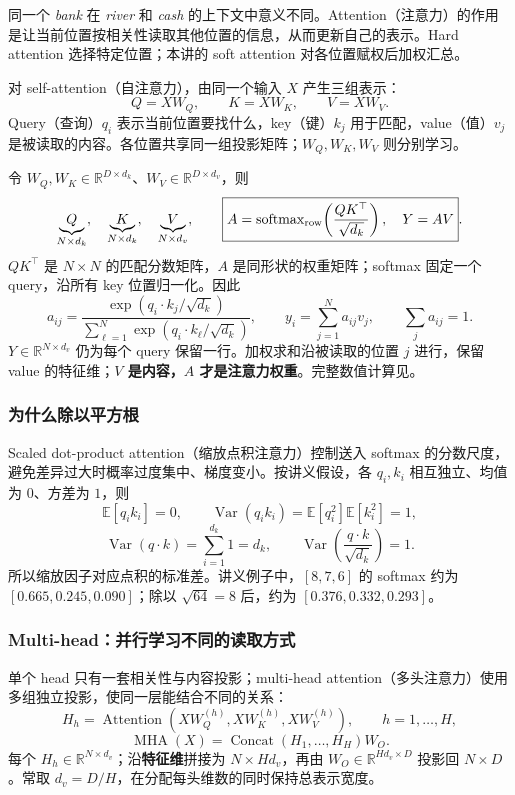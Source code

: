 同一个 \emph{bank} 在 \emph{river} 和 \emph{cash} 的上下文中意义不同。Attention（注意力）的作用是让当前位置按相关性读取其他位置的信息，从而更新自己的表示。Hard attention 选择特定位置；本讲的 soft attention 对各位置赋权后加权汇总。

对 self-attention（自注意力），由同一个输入 $X$ 产生三组表示：
\[
 Q=XW_Q,\qquad K=XW_K,\qquad V=XW_V.
\]
Query（查询）$q_i$ 表示当前位置要找什么，key（键）$k_j$ 用于匹配，value（值）$v_j$ 是被读取的内容。各位置共享同一组投影矩阵；$W_Q,W_K,W_V$ 则分别学习。

令 $W_Q,W_K\in\mathbb R^{D\times d_k}$、$W_V\in\mathbb R^{D\times d_v}$，则
\[
 \underbrace{Q}_{N\times d_k},\quad
 \underbrace{K}_{N\times d_k},\quad
 \underbrace{V}_{N\times d_v},\qquad
 \boxed{A=\operatorname{softmax}_{\rm row}\!\left(\frac{QK^\top}{\sqrt{d_k}}\right),
 \quad Y=AV}.
\]
$QK^\top$ 是 $N\times N$ 的匹配分数矩阵，$A$ 是同形状的权重矩阵；softmax 固定一个 query，沿所有 key 位置归一化。因此
\[
 a_{ij}=\frac{\exp(q_i\cdot k_j/\sqrt{d_k})}
 {\sum_{\ell=1}^{N}\exp(q_i\cdot k_\ell/\sqrt{d_k})},
 \qquad y_i=\sum_{j=1}^{N}a_{ij}v_j,\qquad \sum_j a_{ij}=1.
\]
$Y\in\mathbb R^{N\times d_v}$ 仍为每个 query 保留一行。加权求和沿被读取的位置 $j$ 进行，保留 value 的特征维；\textbf{$V$ 是内容，$A$ 才是注意力权重}。完整数值计算见。

\subsubsection{为什么除以平方根}

Scaled dot-product attention（缩放点积注意力）控制送入 softmax 的分数尺度，避免差异过大时概率过度集中、梯度变小。按讲义假设，各 $q_i,k_i$ 相互独立、均值为 $0$、方差为 $1$，则
\[
 \mathbb E[q_i k_i]=0,\qquad
 \operatorname{Var}(q_i k_i)=\mathbb E[q_i^2]\mathbb E[k_i^2]=1,
\]
\[
 \operatorname{Var}(q\cdot k)=\sum_{i=1}^{d_k}1=d_k,
 \qquad \operatorname{Var}\!\left(\frac{q\cdot k}{\sqrt{d_k}}\right)=1.
\]
所以缩放因子对应点积的标准差。讲义例子中，$[8,7,6]$ 的 softmax 约为 $[0.665,0.245,0.090]$；除以 $\sqrt{64}=8$ 后，约为 $[0.376,0.332,0.293]$。

\subsubsection{Multi-head：并行学习不同的读取方式}

单个 head 只有一套相关性与内容投影；multi-head attention（多头注意力）使用多组独立投影，使同一层能结合不同的关系：
\[
 H_h=\operatorname{Attention}(XW_Q^{(h)},XW_K^{(h)},XW_V^{(h)}),
 \qquad h=1,\ldots,H,
\]
\[
 \operatorname{MHA}(X)=\operatorname{Concat}(H_1,\ldots,H_H)W_O.
\]
每个 $H_h\in\mathbb R^{N\times d_v}$；沿\textbf{特征维}拼接为 $N\times Hd_v$，再由 $W_O\in\mathbb R^{Hd_v\times D}$ 投影回 $N\times D$。常取 $d_v=D/H$，在分配每头维数的同时保持总表示宽度。

